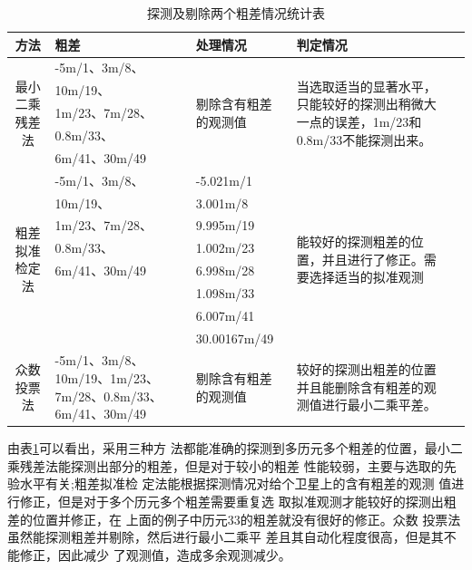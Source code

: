 \documentclass[12pt,hyperref,a4paper,UTF8]{ctexart}
\begin{document}
\begin{table}[h]
    \centering
    \caption{探测及剔除两个粗差情况统计表}
    \label{tab:rejection}
    \begin{tabular}{cp{3cm}p{3cm}p{4cm}p{6cm}}
    \toprule
    方法 & 粗差 & 处理情况 & 判定情况 \\
    \midrule
    \multirow{5}{*}{最小二乘残差法} & -5m/1、3m/8、& \multirow{5}{*}{\parbox{3cm}{剔除含有粗差的观测值}} &     \multirow{5}{*}{\parbox{4cm}{当选取适当的显著水平，只能较好的探测出稍微大一点的误差，1m/23和0.8m/33不能探测出来。}} \\
    &10m/19、 &&\\
    &1m/23、7m/28、&&\\
    &0.8m/33、 &&\\
    &6m/41、30m/49 &&\\
    \hline
    \multirow{8}{*}{粗差拟准检定法} & -5m/1、3m/8、& -5.021m/1& \multirow{8}{*}{\parbox{4cm}{能较好的探测粗差的位置，并且进行了修正。需要选择适当的拟准观测} }\\
    & 10m/19、& 3.001m/8&\\
    & 1m/23、7m/28、 & 9.995m/19&\\
    & 0.8m/33、 & 1.002m/23&\\
    & 6m/41、30m/49 & 6.998m/28&\\
    &&1.098m/33 &\\
    &&6.007m/41&\\
    &&30.00167m/49 &\\
    \hline
    \multirow{5}{*}{ 众数投票法} & -5m/1、3m/8、10m/19、1m/23、7m/28、0.8m/33、6m/41、30m/49 &     \multirow{5}{*}{ \parbox{3cm}{剔除含有粗差的观测值}} &  \multirow{5}{*}{\parbox{4cm}{较好的探测出粗差的位置并且能删除含有粗差的观测值进行最小二乘平差。}} \\
    \bottomrule
    \end{tabular}
\end{table}

由表\ref{tab:rejection}可以看出，采用三种方
法都能准确的探测到多历元多个粗差的位置，最小二
乘残差法能探测出部分的粗差，但是对于较小的粗差
性能较弱，主要与选取的先验水平有关;粗差拟准检
定法能根据探测情况对给个卫星上的含有粗差的观测
值进行修正，但是对于多个历元多个粗差需要重复选
取拟准观测才能较好的探测出粗差的位置并修正，在
上面的例子中历元33的粗差就没有很好的修正。众数
投票法虽然能探测粗差并剔除，然后进行最小二乘平
差且其自动化程度很高，但是其不能修正，因此减少
了观测值，造成多余观测减少。
\end{document}
